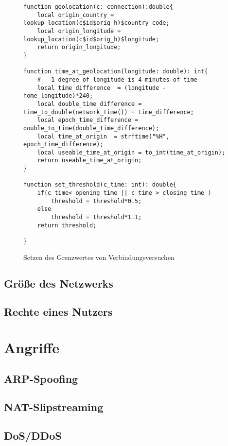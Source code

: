 \begin{figure}[h!]
\begin{lstlisting}
function geolocation(c: connection):double{
	local origin_country = lookup_location(c$id$orig_h)$country_code;
	local origin_longitude = lookup_location(c$id$orig_h)$longitude;
	return origin_longitude;
}

function time_at_geolocation(longitude: double): int{
	#	1 degree of longitude is 4 minutes of time
	local time_difference  = (longitude - home_longitude)*240;
	local double_time_difference = time_to_double(network_time()) + time_difference;
	local epoch_time_difference = double_to_time(double_time_difference);
	local time_at_origin  = strftime("%H", epoch_time_difference);
	local useable_time_at_origin = to_int(time_at_origin);
	return useable_time_at_origin;
}

function set_threshold(c_time: int): double{
	if(c_time< opening_time || c_time > closing_time )
		threshold = threshold*0.5;
	else 
		threshold = threshold*1.1;
	return threshold;

}
\end{lstlisting}
\caption{Setzen des Grenzwertes von Verbindungsversuchen}
\end{figure}
\subsection{Größe des Netzwerks}

\subsection{Rechte eines Nutzers}

\section{Angriffe}
\subsection{ARP-Spoofing}
\subsection{NAT-Slipstreaming}
\subsection{DoS/DDoS}
\subsection{}